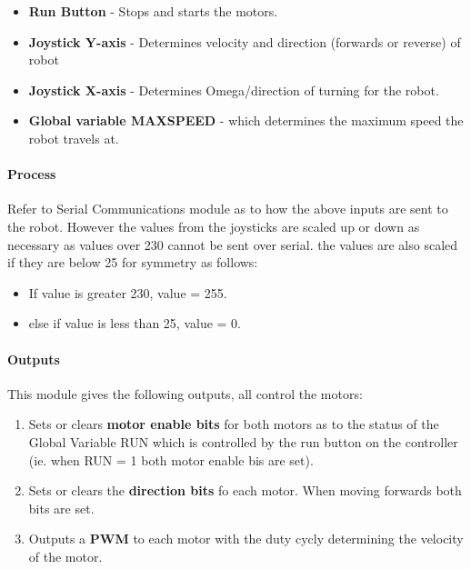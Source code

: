 \documentclass{article}
\begin{document}
	\begin{itemize}
		\item \textbf{Run Button} - Stops and starts the motors.
		\item \textbf{Joystick Y-axis} - Determines velocity and direction (forwards or reverse) of robot
		\item \textbf{Joystick X-axis} - Determines Omega/direction of turning for the robot.
		\item \textbf{Global variable MAX\textunderscore SPEED}  - which determines the maximum speed the robot travels at.
	\end{itemize} 
	
	
	\paragraph{Process}
	
	Refer to Serial Communications module as to how the above inputs are sent to the robot. However the values from the joysticks are scaled up or down as necessary as values over 230 cannot be sent over serial. the values are also scaled if they are below 25 for symmetry as follows:
	
	\begin{itemize}
		\item If value is greater 230, value = 255.
		\item else if value is less than 25, value = 0.
	\end{itemize} 
	
	
	\paragraph{Outputs}
	This module gives the following outputs, all control the motors:
	
	\begin{enumerate}
		\item Sets or clears \textbf{motor enable bits} for both motors as to the status of the Global Variable RUN which is controlled by the run button on the controller (ie. when RUN = 1 both motor enable bis are set).
		\item Sets or clears the \textbf{direction bits} fo each motor. When moving forwards both bits are set.
		\item Outputs a \textbf{PWM} to each motor with the duty cycly determining the velocity of the motor.  	
	\end{enumerate} 
	
\end{document}
